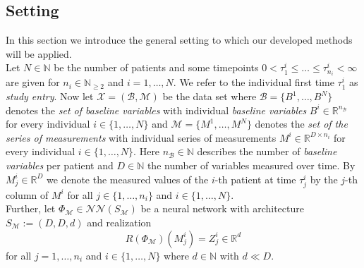 \documentclass[11pt,titlepage]{article}
\newcommand{\R}{\mathbb{R}} %
\newcommand{\N}{\mathbb{N}} %
\theoremstyle{definition}
\theoremstyle{remark}
\begin{document}
	\clearpage
	\subsection{Setting} \label{Methods:Setting}
	In this section we introduce the general setting to which our developed methods will be applied.\\
	
	Let $N\in\N$ be the number of patients and some timepoints $0<\tau^i_1\leq \ldots\leq \tau^i_{n_i}<\infty$ are given for $n_i\in\N_{\geq 2}$ and $i=1,\ldots,N$. 
	We refer to the individual first time $\tau^i_1$ as \textsl{study entry}. Now let   $\mathcal{X}=(\mathcal{B},\mathcal{M})$ be the data set where $\mathcal{B} = \{B^1, \ldots, B^N\}$ denotes the \textsl{set of baseline variables} with 
	individual \textsl{baseline variables} $B^i\in\R^{n_\mathcal{B}}$ for every individual $i\in\{1,\ldots,N\}$ and $\mathcal{M}=\{M^1,\ldots,M^N\}$ denotes the \textsl{set of the series of measurements} with individual series of 
	measurements $M^i\in\R^{D\times n_i}$ for every individual $i\in\{1,\ldots,N\}$. Here $n_\mathcal{B}\in\N$ describes the number of  \textsl{baseline variables} per patient and $D\in\N$ the number of variables measured over time. 
	By $M^i_j\in\R^D$ we denote the measured values of the $i$-th patient at time 
	$\tau_j^i$ 
	by the $j$-th column of $M^i$ 
	for all $j\in\{1,\ldots,n_i\}$ and $i\in\{1,\ldots,N\}$.
	\\
	Further, let $\Phi_\mathcal{M}\in\mathcal{N}\mathcal{N}(S_\mathcal{M})$ be a neural network with architecture $S_\mathcal{M}:= (D, D, d)$ and realization 
	\[R(\Phi_\mathcal{M})(M^i_j) = Z^i_j\in\R^{d}\]
	for all $j=1,\ldots,{n_i}$ and $i\in\{1,\ldots,N\}$ where $d\in\N$ with $d\ll D$.
	
\end{document}
